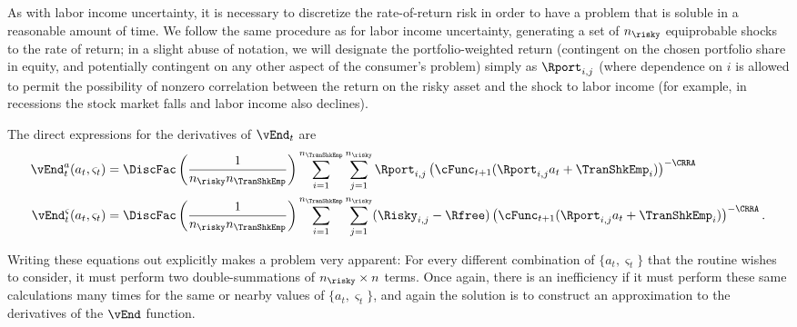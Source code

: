 \documentclass[titlepage, headings=optiontotocandhead]{\econtex}
\begin{document}
As with labor income uncertainty, it is necessary to discretize the
rate-of-return risk in order to have a problem that is soluble in a
reasonable amount of time.  We follow the same procedure as for labor
income uncertainty, generating a set of $n_{\risky}$ equiprobable shocks to the
rate of return; in a slight abuse of notation, we will designate
the portfolio-weighted return (contingent on the
chosen portfolio share in equity, and potentially contingent on any other
aspect of the consumer's problem) simply as $\Rport_{i,j}$ (where dependence
on $i$ is allowed to permit the possibility of nonzero correlation
between the return on the risky asset and the shock to labor income (for example,
in recessions the stock market falls and labor income also declines).

The direct expressions for the derivatives of $\vEnd_{t}$ are
\begin{equation}\begin{gathered}\begin{aligned}
      \vEnd_{t}^{{a}}({a}_{t},\varsigma_{t})  & = \DiscFac \left(\frac{1}{n_{\risky} n_{\TranShkEmp}}\right)\sum_{i=1}^{n_{\TranShkEmp}}\sum_{j=1}^{n_{\risky} }\Rport_{i,j} \left(\cFunc_{t+1}(\Rport_{i,j}{a}_{t}+\TranShkEmp_{i})\right)^{-\CRRA}
      \\      \vEnd_{t}^{\varsigma}({a}_{t},\varsigma_{t})  & = \DiscFac \left(\frac{1}{n_{\risky} n_{\TranShkEmp}}\right)\sum_{i=1}^{n_{\TranShkEmp}}\sum_{j=1}^{n_{\risky} }(\Risky_{i,j}-\Rfree)\left(\cFunc_{t+1}(\Rport_{i,j}{a}_{t}+\TranShkEmp_{i})\right)^{-\CRRA}.
    \end{aligned}\end{gathered}\end{equation}

Writing these equations out explicitly makes a problem very
apparent: For every different combination of $\{{a}_{t},\varsigma_{t}\}$
that the routine wishes to consider, it must perform two
double-summations of $n_{\risky} \times n$ terms.  Once again, there is an
inefficiency if it must perform these same calculations many times
for the same or nearby values of $\{{a}_{t},\varsigma_{t}\}$, and again
the solution is to construct an approximation to the derivatives of
the $\vEnd$ function.
\end{document}
